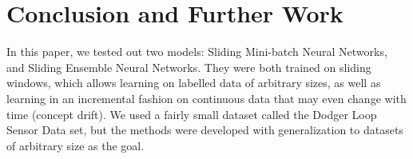 \documentclass[conference]{IEEEtran}
\begin{document}
		
		
		
		\section{Conclusion and Further Work}
		\label{sec:conclusion}
		
		In this paper, we tested out two models: Sliding Mini-batch Neural Networks,  and Sliding Ensemble Neural Networks. They were both trained on sliding windows, which allows learning on labelled data of arbitrary sizes, as well as learning in an incremental fashion on continuous data that may even change with time (concept drift). We used a fairly small dataset called the Dodger Loop Sensor Data set, but the methods were developed with generalization to datasets of arbitrary size as the goal.
		
\end{document}
